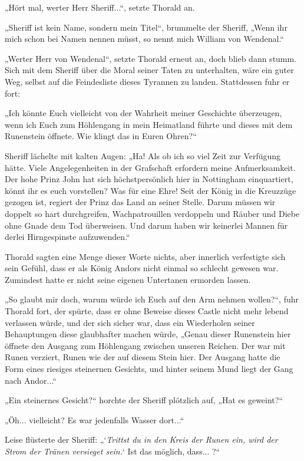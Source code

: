 \documentclass[10pt, a4paper, oneside]{book}
\begin{document}
„Hört mal, werter Herr Sheriff...“, setzte Thorald an.

„Sheriff ist kein Name, sondern mein Titel“, brummelte der Sheriff, „Wenn ihr mich schon bei Namen nennen müsst, so nennt mich William von Wendenal.“

„Werter Herr von Wendenal“, setzte Thorald erneut an, doch blieb dann stumm. Sich mit dem Sheriff über die Moral seiner Taten zu unterhalten, wäre ein guter Weg, selbst auf die Feindesliste dieses Tyrannen zu landen. Stattdessen fuhr er fort:

„Ich könnte Euch vielleicht von der Wahrheit meiner Geschichte überzeugen, wenn ich Euch zum Höhlengang in mein Heimatland führte und dieses mit dem Runenstein öffnete. Wie klingt das in Euren Ohren?“

Sheriff lächelte mit kalten Augen: „Ha! Als ob ich so viel Zeit zur Verfügung hätte. Viele Angelegenheiten in der Grafschaft erfordern meine Aufmerksamkeit. Der hohe Prinz John hat sich höchstpersönlich hier in Nottingham einquartiert, könnt ihr es euch vorstellen? Was für eine Ehre! Seit der König in die Kreuzzüge gezogen ist, regiert der Prinz das Land an seiner Stelle. Darum müssen wir doppelt so hart durchgreifen, Wachpatrouillen verdoppeln und Räuber und Diebe ohne Gnade dem Tod überweisen. Und darum haben wir keinerlei Mannen für derlei Hirngespinste aufzuwenden.“

Thorald sagten eine Menge dieser Worte nichts, aber innerlich verfestigte sich sein Gefühl, dass er als König Andors nicht einmal so schlecht gewesen war. Zumindest hatte er nicht seine eigenen Untertanen ermorden lassen.

„So glaubt mir doch, warum würde ich Euch auf den Arm nehmen wollen?“, fuhr Thorald fort, der spürte, dass er ohne Beweise dieses Castle nicht mehr lebend verlassen würde, und der sich sicher war, dass ein Wiederholen seiner Behauptungen diese glaubhafter machen würde, „Genau dieser Runenstein hier öffnete den Ausgang zum Höhlengang zwischen unseren Reichen. Der war mit Runen verziert, Runen wie der auf diesem Stein hier. Der Ausgang hatte die Form eines riesiges steinernen Gesichts, und hinter seinem Mund liegt der Gang nach Andor...“

„Ein steinernes Gesicht?“ horchte der Sheriff plötzlich auf, „Hat es geweint?“

„Öh... vielleicht? Es war jedenfalls Wasser dort...“

Leise flüsterte der Sheriff: „‘\textit{Trittst du in den Kreis der Runen ein, wird der Strom der Tränen versieget sein.}‘ Ist das möglich, dass... ?“
\end{document}

